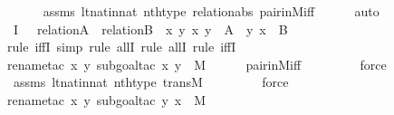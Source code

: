 \begin{isabellebody}
\ \ \ \ \isamarkupfalse%
\ assms\ lt{\isacharunderscore}{\kern0pt}nat{\isacharunderscore}{\kern0pt}in{\isacharunderscore}{\kern0pt}nat\ nth{\isacharunderscore}{\kern0pt}type\ relation{\isacharunderscore}{\kern0pt}abs\ pair{\isacharunderscore}{\kern0pt}in{\isacharunderscore}{\kern0pt}M{\isacharunderscore}{\kern0pt}iff\isanewline
\ \ \ \ \isamarkupfalse%
\ auto\isanewline
\ \ \isamarkupfalse%
\ I{}{\isacharcolon}{\kern0pt}\ {\isachardoublequoteopen}{\isachardot}{\kern0pt}{\isachardot}{\kern0pt}{\isachardot}{\kern0pt}\ {\isasymlongleftrightarrow}\ relation{\isacharparenleft}{\kern0pt}A{\isacharparenright}{\kern0pt}\ {\isasymand}\ relation{\isacharparenleft}{\kern0pt}B{\isacharparenright}{\kern0pt}\ {\isasymand}\ {\isacharparenleft}{\kern0pt}{\isasymforall}x{\isachardot}{\kern0pt}\ {\isasymforall}y{\isachardot}{\kern0pt}\ {\isacharless}{\kern0pt}x{\isacharcomma}{\kern0pt}\ y{\isachargreater}{\kern0pt}\ {\isasymin}\ A\ {\isasymlongleftrightarrow}\ {\isacharless}{\kern0pt}y{\isacharcomma}{\kern0pt}\ x{\isachargreater}{\kern0pt}\ {\isasymin}\ B{\isacharparenright}{\kern0pt}{\isachardoublequoteclose}\ \isanewline
\ \ \ \ \isamarkupfalse%
{\isacharparenleft}{\kern0pt}rule\ iffI{\isacharcomma}{\kern0pt}\ simp{\isacharcomma}{\kern0pt}\ rule\ allI{\isacharcomma}{\kern0pt}\ rule\ allI{\isacharcomma}{\kern0pt}\ rule\ iffI{\isacharparenright}{\kern0pt}\isanewline
\ \ \ \ \ \ \isamarkupfalse%
{\isacharparenleft}{\kern0pt}rename{\isacharunderscore}{\kern0pt}tac\ x\ y{\isacharcomma}{\kern0pt}\ subgoal{\isacharunderscore}{\kern0pt}tac\ {\isachardoublequoteopen}{\isacharless}{\kern0pt}x{\isacharcomma}{\kern0pt}\ y{\isachargreater}{\kern0pt}\ {\isasymin}\ M{\isachardoublequoteclose}{\isacharparenright}{\kern0pt}\isanewline
\ \ \ \ \isamarkupfalse%
\ pair{\isacharunderscore}{\kern0pt}in{\isacharunderscore}{\kern0pt}M{\isacharunderscore}{\kern0pt}iff\isanewline
\ \ \ \ \ \ \ \isamarkupfalse%
\ force\isanewline
\ \ \ \ \isamarkupfalse%
\ assms\ lt{\isacharunderscore}{\kern0pt}nat{\isacharunderscore}{\kern0pt}in{\isacharunderscore}{\kern0pt}nat\ nth{\isacharunderscore}{\kern0pt}type\ transM\ \isanewline
\ \ \ \ \ \ \isamarkupfalse%
\ force\isanewline
\ \ \ \ \ \ \isamarkupfalse%
{\isacharparenleft}{\kern0pt}rename{\isacharunderscore}{\kern0pt}tac\ x\ y{\isacharcomma}{\kern0pt}\ subgoal{\isacharunderscore}{\kern0pt}tac\ {\isachardoublequoteopen}{\isacharless}{\kern0pt}y{\isacharcomma}{\kern0pt}\ x{\isachargreater}{\kern0pt}\ {\isasymin}\ M{\isachardoublequoteclose}{\isacharparenright}{\kern0pt}\isanewline

\end{isabellebody}
